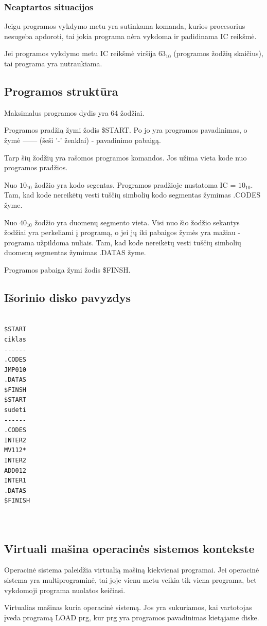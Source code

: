 \documentclass{VUMIFInfKursinis}
\begin{document}
\subsubsection{Neaptartos situacijos}

Jeigu programos vykdymo metu yra sutinkama komanda, kurios procesorius nesugeba apdoroti, tai jokia programa nėra vykdoma ir padidinama IC reikšmė.

Jei programos vykdymo metu IC reikšmė viršija $63_{10}$ (programos žodžių skaičius), tai programa yra nutraukiama.

\subsection{Programos struktūra}

Maksimalus programos dydis yra 64 žodžiai.

Programos pradžią žymi žodis \$START. Po jo yra programos pavadinimas, o žymė ------ (šeši '-' ženklai) - pavadinimo pabaigą. 

Tarp šių žodžių yra rašomos programos komandos. Jos užima vieta kode nuo programos pradžios. 

Nuo $10_{10}$ žodžio yra kodo segentas. Programos pradžioje nustatoma IC = $10_{10}$. Tam, kad kode nereikėtų vesti tuščių simbolių kodo segmentas žymimas .CODES žyme.

Nuo $40_{10}$ žodžio yra duomenų segmento vieta. Visi nuo šio žodžio sekantys žodžiai yra perkeliami į programą, o jei jų iki pabaigos žymės yra mažiau - programa užpildoma nuliais.
Tam, kad kode nereikėtų vesti tuščių simbolių duomenų segmentas žymimas .DATAS žyme.

Programos pabaiga žymi žodis \$FINSH. 

\subsection{Išorinio disko pavyzdys}

\begin{verbatim}
	
$START
ciklas
------
.CODES
JMP010
.DATAS
$FINSH
$START
sudeti
------
.CODES
INTER2
MV112*
INTER2
ADD012
INTER1
.DATAS
$FINISH

	
\end{verbatim}


\subsection{Virtuali mašina operacinės sistemos kontekste}

Operacinė sistema paleidžia virtualią mašiną kiekvienai programai. Jei operacinė sistema yra multiprograminė, tai joje vienu metu veikia tik viena programa, bet vykdomoji programa nuolatos keičiasi.

Virtualias mašinas kuria operacinė sistemą. Jos yra sukuriamos, kai vartotojas įveda programą LOAD prg, kur prg yra programos pavadinimas kietąjame diske.

\printbibliography[heading=bibintoc] %
\appendix  %
\end{document}
